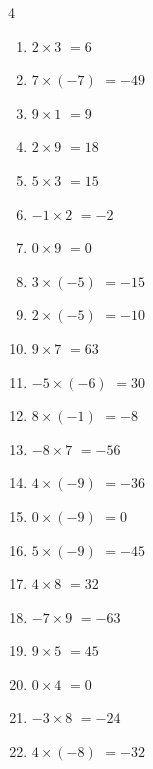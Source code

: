 \begin{multicols}{4}
\begin{enumerate}
  \item $2\times 3$
        $=6$

  \item $7\times (-7)$
        $=-49$

  \item $9\times 1$
        $=9$

  \item $2\times 9$
        $=18$

  \item $5\times 3$
        $=15$

  \item $-1\times 2$
        $=-2$

  \item $0\times 9$
        $=0$

  \item $3\times (-5)$
        $=-15$

  \item $2\times (-5)$
        $=-10$

\columnbreak %

\resetques

  \item $9\times 7$
        $=63$

  \item $-5\times (-6)$
        $=30$

  \item $8\times (-1)$
        $=-8$

  \item $-8\times 7$
        $=-56$

  \item $4\times (-9)$
        $=-36$

  \item $0\times (-9)$
        $=0$

  \item $5\times (-9)$
        $=-45$

  \item $4\times 8$
        $=32$

  \item $-7\times 9$
        $=-63$

  \item $9\times 5$
        $=45$

  \item $0\times 4$
        $=0$

  \item $-3\times 8$
        $=-24$

  \item $4\times (-8)$
        $=-32$


\end{enumerate}
\end{multicols}
